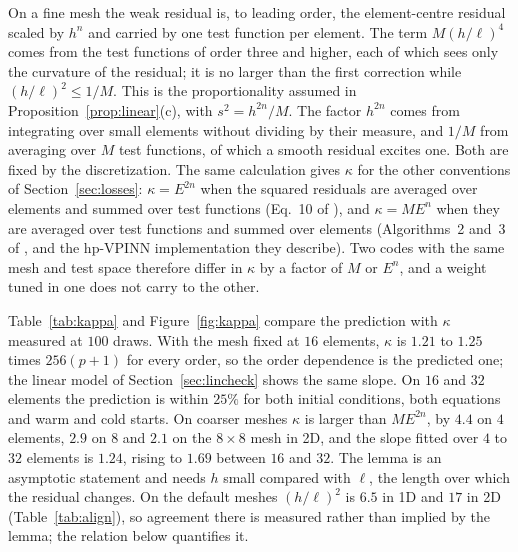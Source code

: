 \documentclass[a4paper,fleqn]{cas-sc}
\begin{document}
On a fine mesh the weak residual is, to leading order, the element-centre residual scaled by $h^n$ and carried by one
test function per element. The term $M(h/\ell)^4$ comes from the test functions of order three and higher, each of which
sees only the curvature of the residual; it is no larger than the first correction while $(h/\ell)^2\le1/M$. This is the proportionality assumed in Proposition~\ref{prop:linear}(c), with $s^2=h^{2n}/M$.
The factor $h^{2n}$ comes from integrating over small elements without dividing by their measure, and $1/M$ from
averaging over $M$ test functions, of which a smooth residual excites one. Both are fixed by the discretization. The same calculation gives $\kappa$ for the other
conventions of Section~\ref{sec:losses}: $\kappa=E^{2n}$ when the squared residuals are averaged over elements and summed
over test functions (Eq.~10 of \cite{fastvpinn2024}), and $\kappa=ME^{n}$ when they are averaged over test functions and
summed over elements (Algorithms~2 and~3 of \cite{fastvpinn2024}, and the hp-VPINN implementation they describe).
Two codes with the same mesh and test space therefore differ in $\kappa$ by a factor of $M$ or $E^n$, and a weight tuned in one
does not carry to the other.

Table~\ref{tab:kappa} and Figure~\ref{fig:kappa} compare the prediction with $\kappa$ measured at $100$ draws. With the
mesh fixed at $16$ elements, $\kappa$ is $1.21$ to $1.25$ times $256(p+1)$ for every order, so the order dependence is
the predicted one; the linear model of Section~\ref{sec:lincheck} shows the same slope. On $16$ and $32$ elements the
prediction is within $25\%$ for both initial conditions, both equations and warm and cold starts. On coarser meshes
$\kappa$ is larger than $ME^{2n}$, by $4.4$ on $4$ elements, $2.9$ on $8$ and $2.1$ on the $8\times8$ mesh in 2D, and the
slope fitted over $4$ to $32$ elements is $1.24$, rising to $1.69$ between $16$ and $32$. The lemma is an asymptotic
statement and needs $h$ small compared with $\ell$, the length over which the residual changes. On the default meshes
$(h/\ell)^2$ is $6.5$ in 1D and $17$ in 2D (Table~\ref{tab:align}), so agreement there is measured rather than implied by
the lemma; the relation below quantifies it.
\end{document}
